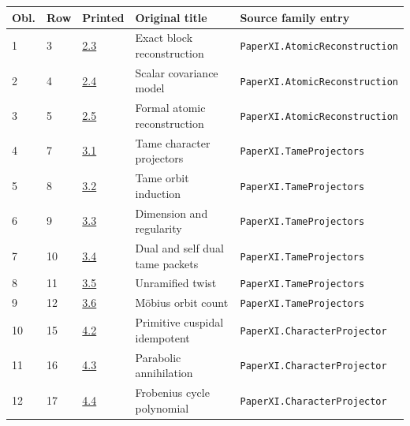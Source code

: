 \documentclass[10pt,oneside]{book}
\begin{document}
\begin{longtable}{@{}p{}p{}p{}>{\raggedright\arraybackslash}p{}p{}@{}}\toprule Obl.&Row&Printed&Original title&Source family entry\\\midrule\endhead

1&3&\href{https://komorebi.invalid/b07/obligation_01}{2.3}&Exact block reconstruction&\nolinkurl{PaperXI.AtomicReconstruction}\\

2&4&\href{https://komorebi.invalid/b07/obligation_02}{2.4}&Scalar covariance model&\nolinkurl{PaperXI.AtomicReconstruction}\\

3&5&\href{https://komorebi.invalid/b07/obligation_03}{2.5}&Formal atomic reconstruction&\nolinkurl{PaperXI.AtomicReconstruction}\\

4&7&\href{https://komorebi.invalid/b07/obligation_04}{3.1}&Tame character projectors&\nolinkurl{PaperXI.TameProjectors}\\

5&8&\href{https://komorebi.invalid/b07/obligation_05}{3.2}&Tame orbit induction&\nolinkurl{PaperXI.TameProjectors}\\

6&9&\href{https://komorebi.invalid/b07/obligation_06}{3.3}&Dimension and regularity&\nolinkurl{PaperXI.TameProjectors}\\

7&10&\href{https://komorebi.invalid/b07/obligation_07}{3.4}&Dual and self dual tame packets&\nolinkurl{PaperXI.TameProjectors}\\

8&11&\href{https://komorebi.invalid/b07/obligation_08}{3.5}&Unramified twist&\nolinkurl{PaperXI.TameProjectors}\\

9&12&\href{https://komorebi.invalid/b07/obligation_09}{3.6}&Möbius orbit count&\nolinkurl{PaperXI.TameProjectors}\\

10&15&\href{https://komorebi.invalid/b07/obligation_10}{4.2}&Primitive cuspidal idempotent&\nolinkurl{PaperXI.CharacterProjector}\\

11&16&\href{https://komorebi.invalid/b07/obligation_11}{4.3}&Parabolic annihilation&\nolinkurl{PaperXI.CharacterProjector}\\

12&17&\href{https://komorebi.invalid/b07/obligation_12}{4.4}&Frobenius cycle polynomial&\nolinkurl{PaperXI.CharacterProjector}\\


\end{longtable}
\end{document}
